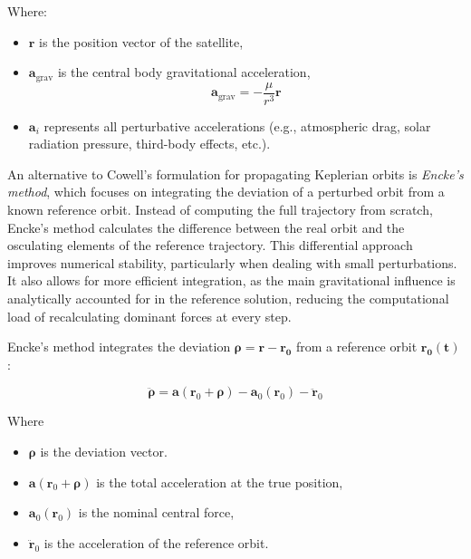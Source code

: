 \documentclass[letterpaper, preprint, paper,11pt]{AAS}	%
\begin{document}
Where:

\begin{itemize}
    \item $\mathbf{r}$ is the position vector of the satellite,
    \item $\mathbf{a}_{\text{grav}}$ is the central body gravitational acceleration,
    \begin{equation}
        \mathbf{a}_{\text{grav}} = -\frac{\mu}{r^3} \mathbf{r}
    \end{equation}
    \item $\mathbf{a}_{i}$ represents all perturbative accelerations (e.g., atmospheric drag, solar radiation pressure, third-body effects, etc.).
\end{itemize}

An alternative to Cowell’s formulation for propagating Keplerian orbits is \textit{Encke’s method}, which focuses on integrating the deviation of a perturbed orbit from a known reference orbit. Instead of computing the full trajectory from scratch, Encke’s method calculates the difference between the real orbit and the osculating elements of the reference trajectory. This differential approach improves numerical stability, particularly when dealing with small perturbations. It also allows for more efficient integration, as the main gravitational influence is analytically accounted for in the reference solution, reducing the computational load of recalculating dominant forces at every step.

Encke’s method integrates the deviation $\boldsymbol{\rho}=\mathbf{r}-\mathbf{r_0}$ from a reference orbit $\mathbf{r_0(t)}$:

\begin{equation}
\ddot{\boldsymbol{\rho}} = \mathbf{a}(\mathbf{r}_0 + \boldsymbol{\rho}) - \mathbf{a}_0(\mathbf{r}_0) - \ddot{\mathbf{r}}_0
\end{equation}

Where

\begin{itemize}
    \item $\boldsymbol{\rho}$ is the deviation vector.
    \item $\mathbf{a}(\mathbf{r}_0 + \boldsymbol{\rho})$ is the total acceleration at the true position,
    \item $\mathbf{a}_0(\mathbf{r}_0)$ is the nominal central force,
    \item $\ddot{\mathbf{r}}_0$ is the acceleration of the reference orbit.
\end{itemize}
\end{document}
